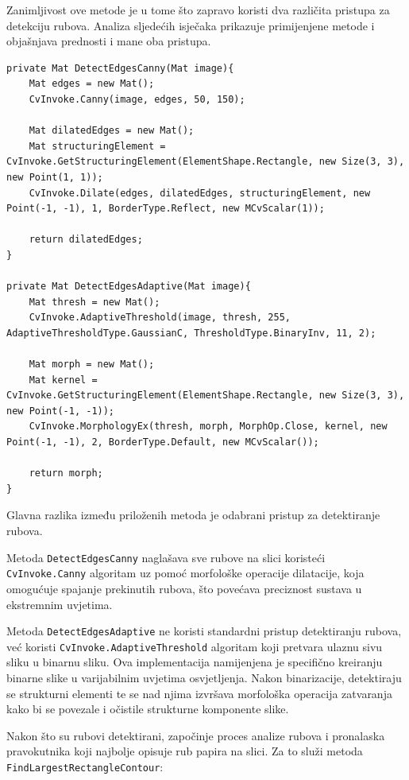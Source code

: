 \documentclass{foi}
\begin{document}
Zanimljivost ove metode je u tome što zapravo koristi dva različita pristupa za detekciju rubova. Analiza sljedećih isječaka prikazuje primijenjene metode i objašnjava prednosti i mane oba pristupa.

\pagebreak
\begin{lstlisting}[caption={Metoda za detekciju rubova tijekom ispravka perspektive}]
private Mat DetectEdgesCanny(Mat image){
    Mat edges = new Mat();
    CvInvoke.Canny(image, edges, 50, 150);

    Mat dilatedEdges = new Mat();
    Mat structuringElement = CvInvoke.GetStructuringElement(ElementShape.Rectangle, new Size(3, 3), new Point(1, 1));
    CvInvoke.Dilate(edges, dilatedEdges, structuringElement, new Point(-1, -1), 1, BorderType.Reflect, new MCvScalar(1));

    return dilatedEdges;
}

private Mat DetectEdgesAdaptive(Mat image){
    Mat thresh = new Mat();
    CvInvoke.AdaptiveThreshold(image, thresh, 255, AdaptiveThresholdType.GaussianC, ThresholdType.BinaryInv, 11, 2);

    Mat morph = new Mat();
    Mat kernel = CvInvoke.GetStructuringElement(ElementShape.Rectangle, new Size(3, 3), new Point(-1, -1));
    CvInvoke.MorphologyEx(thresh, morph, MorphOp.Close, kernel, new Point(-1, -1), 2, BorderType.Default, new MCvScalar());

    return morph;
}
\end{lstlisting}

Glavna razlika između priloženih metoda je odabrani pristup za detektiranje rubova.

Metoda \texttt{DetectEdgesCanny} naglašava sve rubove na slici koristeći \texttt{CvInvoke.Canny} algoritam uz pomoć morfološke operacije dilatacije, koja omogućuje spajanje prekinutih rubova, što povećava preciznost sustava u ekstremnim uvjetima.

Metoda \texttt{DetectEdgesAdaptive} ne koristi standardni pristup detektiranju rubova, već koristi \texttt{CvInvoke.AdaptiveThreshold} algoritam koji pretvara ulaznu sivu sliku u binarnu sliku. Ova implementacija namijenjena je specifično kreiranju binarne slike u varijabilnim uvjetima osvjetljenja. Nakon binarizacije, detektiraju se strukturni elementi te se nad njima izvršava morfološka operacija zatvaranja kako bi se povezale i očistile strukturne komponente slike.


Nakon što su rubovi detektirani, započinje proces analize rubova i pronalaska pravokutnika koji najbolje opisuje rub papira na slici. Za to služi metoda \texttt{FindLargestRectangleContour}:
\end{document}
